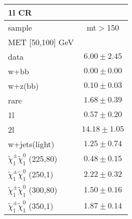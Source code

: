 \begin{table}
\begin{center}
\small
\begin{tabular}{lc}
\hline
1l CR & \\
\hline
sample&mt$>$150\\
\hline
MET [50,100] GeV &  \\
\hline
data&$6.00\pm2.45$\\
\hline
w+bb&$0.00\pm0.00$\\
w+z(bb)&$0.10\pm0.03$\\
rare&$1.68\pm0.39$\\
1l&$0.57\pm0.20$\\
2l&$14.18\pm1.05$\\
w+jets(light)&$1.25\pm0.74$\\
$\tilde{\chi}_{1}^{\pm}\tilde{\chi}_{1}^{0}$ (225,80)&$0.48\pm0.15$\\
$\tilde{\chi}_{1}^{\pm}\tilde{\chi}_{1}^{0}$ (250,1)&$2.22\pm0.32$\\
$\tilde{\chi}_{1}^{\pm}\tilde{\chi}_{1}^{0}$ (300,80)&$1.50\pm0.16$\\
$\tilde{\chi}_{1}^{\pm}\tilde{\chi}_{1}^{0}$ (350,1)&$1.87\pm0.14$\\
\hline
\hline\hline
\hline
\end{tabular}
\end{center}
\end{table}
